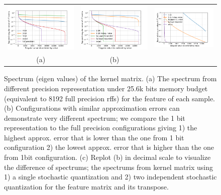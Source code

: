 \begin{figure}
	\centering
	\begin{tabular}{c c c}
		\includegraphics[width=.33\linewidth]{figures/spectrum_8192.pdf} &
		\includegraphics[width=.33\linewidth]{figures/different_spectrum_with_same_kernel_approx_error_log.pdf} &
		\includegraphics[width=.33\linewidth]{figures/different_spectrum_with_same_kernel_approx_error.pdf}\\
		(a) & (b)
	\end{tabular}
	\caption{Spectrum (eigen values) of the kernel matrix. (a) The spectrum from different precision representation under 25.6k bits memory budget (equivalent to 8192 full precision rffs) for the feature of each sample. (b) Configurations with similar approximation errors can demonstrate very different spectrum; we compare the 1 bit representation to the full precision configurations giving 1) the highest approx. error that is lower than the one from 1 bit configuration 2) the lowest approx. error that is higher than the one from 1bit configuration. (c) Replot (b) in decimal scale to visualize the difference of spectrums; the spectrums from kernel matrix using 1) a single stochastic quantization and 2) two independent stochastic quantization for the feature matrix and its transpose.}
\end{figure}


